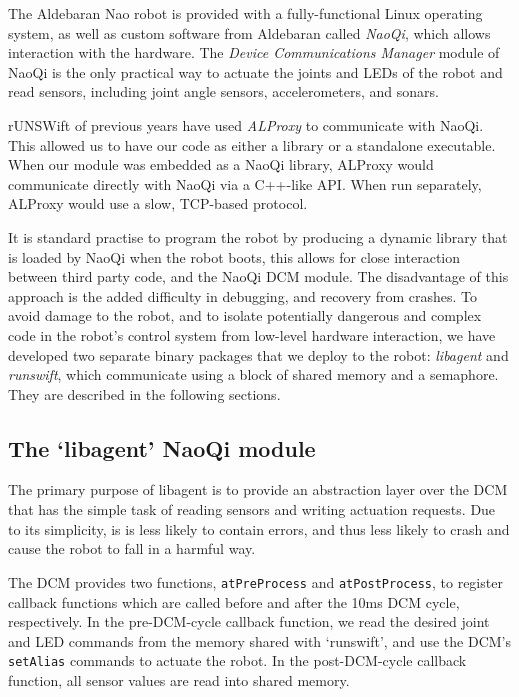 \documentclass[pdftex,11pt,a4paper]{report}
\begin{document}
The Aldebaran Nao robot is provided with a fully-functional Linux operating
system, as well as custom software from Aldebaran called \emph{NaoQi}, which
allows interaction with the hardware. The \emph{Device Communications Manager}
module of NaoQi is the only practical way to actuate the joints and LEDs of
the robot and read sensors, including joint angle sensors, accelerometers,
and sonars.

rUNSWift of previous years have used \emph{ALProxy} to communicate with NaoQi.  This
allowed us to have our code as either a library or a standalone executable. 
When our module was embedded as a NaoQi library, ALProxy would communicate
directly with NaoQi via a C++-like API.  When run separately, ALProxy would use
a slow, TCP-based protocol.

It is standard practise to program the robot by producing a dynamic library
that is loaded by NaoQi when the robot boots, this allows for close
interaction between third party code, and the NaoQi DCM module. The
disadvantage of this approach is the added difficulty in debugging, and
recovery from crashes. To avoid damage to the robot, and to isolate
potentially dangerous and complex code in the robot's control system from
low-level hardware interaction, we have developed two separate binary
packages that we deploy to the robot: \emph{libagent} and \emph{runswift}, which
communicate using a block of shared memory and a semaphore. They are
described in the following sections.

\subsection{The `libagent' NaoQi module}

The primary purpose of libagent is to provide an abstraction layer over
the DCM that has the simple task of reading sensors and writing actuation
requests. Due to its simplicity, is is less likely to contain errors, and
thus less likely to crash and cause the robot to fall in a harmful way.

The DCM provides two functions, \texttt{atPreProcess} and
\texttt{atPostProcess}, to register callback functions which are called before
and after the 10ms DCM cycle, respectively. In the pre-DCM-cycle callback
function, we read the desired joint and LED commands from the memory shared with
`runswift', and use the DCM's \texttt{setAlias} commands to actuate the robot.
In the post-DCM-cycle callback function, all sensor values are read into shared
memory.
\end{document}
